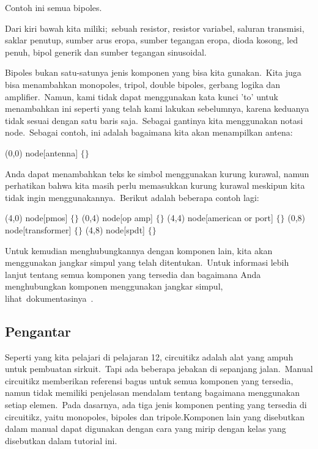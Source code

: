\noindent 
Contoh ini semua bipoles.
\par


\noindent 
Dari kiri bawah kita miliki; sebuah resistor, resistor variabel, saluran transmisi, saklar penutup, sumber arus eropa, sumber tegangan eropa, dioda kosong, led penuh, bipol generik dan sumber tegangan sinusoidal.
\par


\noindent 
Bipoles bukan satu-satunya jenis komponen yang bisa kita gunakan. Kita juga bisa menambahkan monopoles, tripol, double bipoles, gerbang logika dan amplifier. Namun, kami tidak dapat menggunakan kata kunci 'to' untuk menambahkan ini seperti yang telah kami lakukan sebelumnya, karena keduanya tidak sesuai dengan satu baris saja. Sebagai gantinya kita menggunakan notasi node. Sebagai contoh, ini adalah bagaimana kita akan menampilkan antena:
\par


\noindent 
 (0,0) node[antenna] $ \{ $$ \} $ 
\par


\noindent 
Anda dapat menambahkan teks ke simbol menggunakan kurung kurawal, namun perhatikan bahwa kita masih perlu memasukkan kurung kurawal meskipun kita tidak ingin menggunakannya. Berikut adalah beberapa contoh lagi:
\par


\noindent 
 (4,0) node[pmos] $ \{ $$ \} $ (0,4) node[op amp] $ \{ $$ \} $ (4,4) node[american or port] $ \{ $$ \} $ (0,8) node[transformer] $ \{ $$ \} $ (4,8) node[spdt] $ \{ $$ \} $ 
\par


\noindent 
Untuk kemudian menghubungkannya dengan komponen lain, kita akan menggunakan jangkar simpul yang telah ditentukan. Untuk informasi lebih lanjut tentang semua komponen yang tersedia dan bagaimana Anda menghubungkan komponen menggunakan jangkar simpul, lihat dokumentasinya .
\par


\subsection{Pengantar}


\noindent 
Seperti yang kita pelajari di pelajaran 12, circuitikz adalah alat yang ampuh untuk pembuatan sirkuit. Tapi ada beberapa jebakan di sepanjang jalan. Manual circuitikz memberikan referensi bagus untuk semua komponen yang tersedia, namun tidak memiliki penjelasan mendalam tentang bagaimana menggunakan setiap elemen. Pada dasarnya, ada tiga jenis komponen penting yang tersedia di circuitikz, yaitu monopoles, bipoles dan tripole.Komponen lain yang disebutkan dalam manual dapat digunakan dengan cara yang mirip dengan kelas yang disebutkan dalam tutorial ini.
\par


